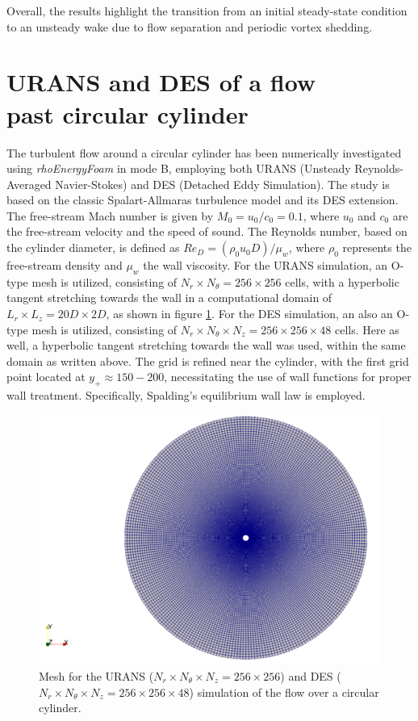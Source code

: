 \documentclass[a5paper]{sapthesis}
\begin{document}
	\noindent Overall, the results highlight the transition from an initial steady-state condition to an unsteady wake due to flow separation and periodic vortex shedding.
	

	\section{URANS and DES of a flow \\ past circular cylinder}
	The turbulent flow around a circular cylinder has been numerically investigated using \textit{rhoEnergyFoam} in mode B, employing both URANS (Unsteady Reynolds-Averaged Navier-Stokes) and DES (Detached Eddy Simulation). The study is based on the classic Spalart-Allmaras turbulence model and its DES extension. The free-stream Mach number is given by $M_0 = u_0/c_0 = 0.1$,	where $u_0$ and $c_0$ are the free-stream velocity and the speed of sound. The Reynolds number, based on the cylinder diameter, is defined as $Re_D = (\rho_0 u_0 D)/\mu_w$, where $\rho_0$ represents the free-stream density and $\mu_w$ the wall viscosity. For the URANS simulation, an O-type mesh is utilized, consisting of $ N_r \times N_\theta = 256 \times 256 $ cells, with a hyperbolic tangent stretching towards the wall in a computational domain of $ L_r \times L_z = 20D \times 2D $, as shown in figure \ref{Cylinder_mesh}. For the DES simulation, an also an O-type mesh is utilized, consisting of $ N_r \times N_\theta \times N_z = 256 \times 256 \times 48 $ cells. Here as well, a hyperbolic tangent stretching towards the wall was used, within the same domain as written above. The grid is refined near the cylinder, with the first grid point located at $ y_+ \approx 150 - 200 $, necessitating the use of wall functions for proper wall treatment. Specifically, Spalding’s equilibrium wall law \citep{spalding1961single} is employed. 
	
	\begin{figure}[h]
		\centering
		\includegraphics[width=0.7 \linewidth]{Figures/Cylinder_mesh}
		\caption[Mesh for the URANS and DES simulation of the cylinder]{Mesh for the URANS ($ N_r \times N_\theta \times N_z = 256 \times 256$) and DES ($ N_r \times N_\theta \times N_z = 256 \times 256 \times 48 $) simulation of the flow over a circular cylinder.}
		\label{Cylinder_mesh}
	\end{figure} 
	
\end{document}
